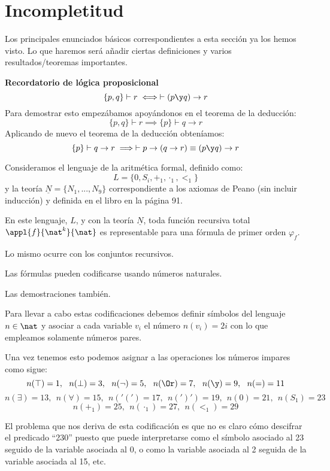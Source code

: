 \section{Incompletitud}

Los principales enunciados básicos correspondientes a esta sección ya los hemos visto. Lo que haremos será añadir ciertas definiciones y varios resultados/teoremas importantes.

\textbf{Recordatorio de lógica proposicional}
\[\{p,q\}\vdash r \iff \vdash (p\y q) \to r\]
Para demostrar esto empezábamos apoyándonos en el teorema de la deducción:
\[\{p,q\} \vdash r \implies \{p\} \vdash q \to r\]
Aplicando de nuevo el teorema de la deducción obteníamos:
\[\{p\} \vdash q \to r \implies \vdash p \to (q \to r) \equiv (p \y q ) \to r\]

\begin{theorem}
Consideramos el lenguaje de la aritmética formal, definido como:
\[L=\{0,S_i,+_1,\cdot_1, <_1\}\]
y la teoría $\underline{N}=\{N_1,...,N_9\}$ correspondiente a los axiomas de Peano (sin incluir inducción) y definida en el libro en la página 91.

En este lenguaje, $L$, y con la teoría $\underline{N}$, toda función recursiva total $\appl{f}{\nat^k}{\nat}$ es representable para una fórmula de primer orden $\varphi_f$.

Lo mismo ocurre con los conjuntos recursivos.
\end{theorem}

\begin{prop}[Codificación]
Las fórmulas pueden codificarse usando números naturales.

Las demostraciones también.

\end{prop}

Para llevar a cabo estas codificaciones debemos definir símbolos del lenguaje $n \in \nat$ y asociar a cada variable $v_i$ el número $n(v_i)=2i$ con lo que empleamos solamente números pares.

Una vez tenemos esto podemos asignar a las operaciones los números impares como sigue:
\[n(\top) = 1, \ \ n(\perp)=3, \ \ n(\neg) = 5, \ \ n(\Or) = 7, \ \ n(\y)=9, \ \ n(=)=11\]
\[n(\exists)=13, \ \ n(\forall) =15, \ \ n('(')=17, \ \ n(')')=19, \ \ n(0)=21, \ \ n(S_1)=23\]
\[n(+_1)=25, \ \ n(\cdot_1)=27, \ \ n(<_1) = 29\]

El problema que nos deriva de esta codificación es que no es claro cómo descifrar el predicado ``230'' puesto que puede interpretarse como el símbolo asociado al 23 seguido de la variable asociada al 0, o como la variable asociada al 2 seguida de la variable asociada al 15, etc.

